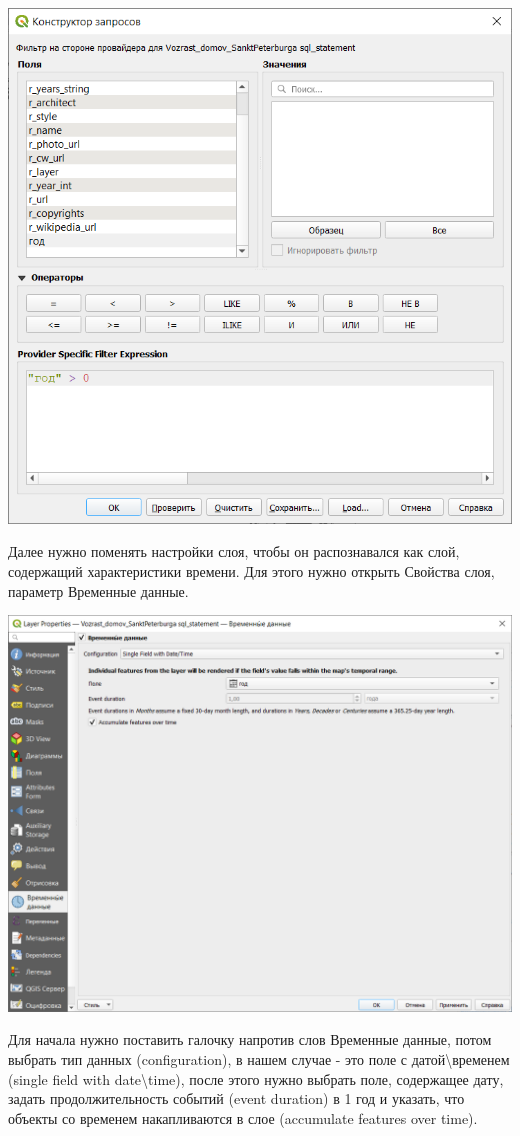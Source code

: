 \documentclass[
]{book}
\begin{document}
\includegraphics{figures/60.png}

Далее нужно поменять настройки слоя, чтобы он распознавался как слой, содержащий характеристики времени. Для этого нужно открыть Свойства слоя, параметр Временные данные.

\includegraphics{figures/61.png}

Для начала нужно поставить галочку напротив слов Временные данные, потом выбрать тип данных (configuration), в нашем случае - это поле с датой\textbackslash временем (single field with date\textbackslash time), после этого нужно выбрать поле, содержащее дату, задать продолжительность событий (event duration) в 1 год и указать, что объекты со временем накапливаются в слое (accumulate features over time).
\end{document}

